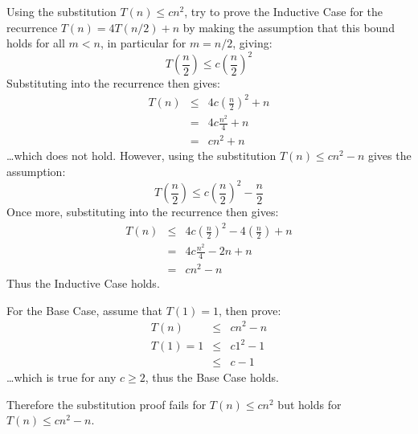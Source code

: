 Using the substitution $T(n) \leq cn^2$, try to prove the Inductive Case for the recurrence $T(n) = 4T(n/2) + n$ by making the assumption that this bound holds for all $m < n$, in particular for $m = n/2$, giving:
\begin{equation*}
	T\left(\frac{n}{2}\right) \leq c\left(\frac{n}{2}\right)^2
\end{equation*}
Substituting into the recurrence then gives:
\begin{eqnarray*}
	T(n) &\leq& 4c\left(\frac{n}{2}\right)^2 + n \\
	 &=& 4c\frac{n^2}{4} + n \\
	 &=& cn^2 + n
\end{eqnarray*}
\ldots which does not hold.  However, using the substitution $T(n) \leq cn^2 - n$ gives the assumption:
\begin{equation*}
	T\left(\frac{n}{2}\right) \leq c\left(\frac{n}{2}\right)^2 - \frac{n}{2}
\end{equation*}
Once more, substituting into the recurrence then gives:
\begin{eqnarray*}
	T(n) &\leq& 4c\left(\frac{n}{2}\right)^2 - 4\left(\frac{n}{2}\right) + n \\
	 &=& 4c \frac{n^2}{4} - 2n + n \\
	 &=& cn^2 - n
\end{eqnarray*}
Thus the Inductive Case holds.

For the Base Case, assume that $T(1) = 1$, then prove:
\begin{eqnarray*}
	T(n) &\leq& cn^2 - n \\
	T(1) = 1 &\leq& c1^2 - 1 \\
	 &\leq& c - 1
\end{eqnarray*}
\ldots which is true for any $c \geq 2$, thus the Base Case holds.

Therefore the substitution proof fails for $T(n) \leq cn^2$ but holds for $T(n) \leq cn^2 - n$.

